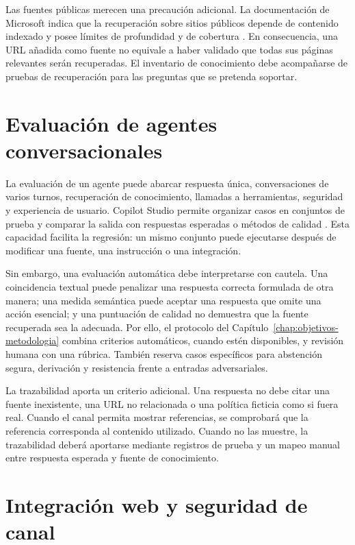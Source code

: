 Las fuentes públicas merecen una precaución adicional. La documentación de
Microsoft indica que la recuperación sobre sitios públicos depende de contenido
indexado y posee límites de profundidad y de cobertura \cite{copilotPublicWeb}.
En consecuencia, una URL añadida como fuente no equivale a haber validado que
todas sus páginas relevantes serán recuperadas. El inventario de conocimiento
debe acompañarse de pruebas de recuperación para las preguntas que se pretenda
soportar.

\section{Evaluación de agentes conversacionales}
\label{sec:evaluacion-agentes}

La evaluación de un agente puede abarcar respuesta única, conversaciones de
varios turnos, recuperación de conocimiento, llamadas a herramientas, seguridad
y experiencia de usuario. Copilot Studio permite organizar casos en conjuntos de
prueba y comparar la salida con respuestas esperadas o métodos de calidad
\cite{copilotEvaluation}. Esta capacidad facilita la regresión: un mismo conjunto
puede ejecutarse después de modificar una fuente, una instrucción o una
integración.

Sin embargo, una evaluación automática debe interpretarse con cautela. Una
coincidencia textual puede penalizar una respuesta correcta formulada de otra
manera; una medida semántica puede aceptar una respuesta que omite una acción
esencial; y una puntuación de calidad no demuestra que la fuente recuperada sea
la adecuada. Por ello, el protocolo del Capítulo~\ref{chap:objetivos-metodologia}
combina criterios automáticos, cuando estén disponibles, y revisión humana con
una rúbrica. También reserva casos específicos para abstención segura,
derivación y resistencia frente a entradas adversariales.

La trazabilidad aporta un criterio adicional. Una respuesta no debe citar una
fuente inexistente, una URL no relacionada o una política ficticia como si fuera
real. Cuando el canal permita mostrar referencias, se comprobará que la
referencia corresponda al contenido utilizado. Cuando no las muestre, la
trazabilidad deberá aportarse mediante registros de prueba y un mapeo manual
entre respuesta esperada y fuente de conocimiento.

\section{Integración web y seguridad de canal}
\label{sec:integracion-web}

